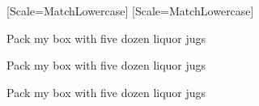   \setmainfont{TeX Gyre Bonum}
  \setsansfont{Latin Modern Sans}[Scale=MatchLowercase]
  \setmonofont{Inconsolata}[Scale=MatchLowercase]

  \rmfamily Pack my box with five dozen liquor jugs\par
  \sffamily Pack my box with five dozen liquor jugs\par
  \ttfamily Pack my box with five dozen liquor jugs
